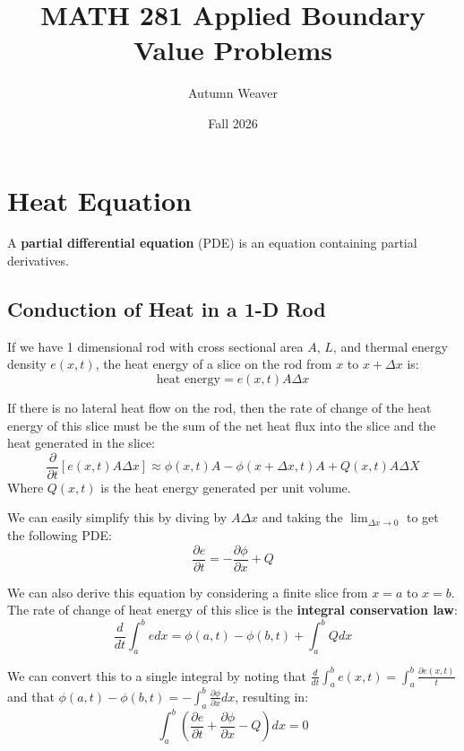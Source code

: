 \documentclass{article}
\title{\textbf{MATH 281 Applied Boundary Value Problems}}
\author{Autumn Weaver}
\date{Fall 2026}
\begin{document}
\maketitle

\tableofcontents{\textbf{}}

\pagebreak

\pagestyle{fancy}
\fancyhead{}
\fancyhead[L]{\thetitle}

\section{Heat Equation}
\begin{definition}
A \textbf{partial differential equation} (PDE) is an equation 
containing partial derivatives. 
\end{definition}

\subsection{Conduction of Heat in a 1-D Rod}

If we have 1 dimensional rod with cross sectional area \(A\), \(L\), and thermal energy density \(e(x,t)\), the heat energy of a slice on the rod 
from \(x\) to \(x+\Delta x\) is:
\[
    \text{heat energy}=e(x,t)A\Delta x
\]  

If there is no lateral heat flow on the rod, then the rate of change of the heat energy of 
this slice must be the sum of the net heat flux into the slice and the heat generated in the slice:
\[
    \frac{\partial }{\partial t}[e(x,t)A\Delta x]\approx \phi(x, t)A-\phi(x+\Delta x, t)A+Q(x, t)A\Delta X
\]
Where \(Q(x, t)\) is the heat energy generated per unit volume.


We can easily simplify this by diving by \(A \Delta x\) and taking the \(\lim_{\Delta x \rightarrow 0}\)  to get the following PDE:
\[
    \frac{\partial e}{\partial t}=-\frac{\partial \phi}{\partial x}+Q
\]

We can also derive this equation by considering a finite slice from \(x=a\) to \(x=b\). The rate of change of heat energy of this slice is the \textbf{integral conservation law}: 
\[
    \frac{d}{dt}\int_a^b e dx=\phi(a,t)-\phi (b,t)+\int_a^b Q dx
\]

We can convert this to a single integral by noting that \(\frac{d}{dt}\int_a^b e(x, t)=\int_a^b\frac{\partial e(x, t)}{t}\) and that 
\(\phi(a, t)-\phi(b, t)=-\int_a^b \frac{\partial \phi}{\partial x}dx\), resulting in: 
\[
    \int_a^b (\frac{\partial e}{\partial t}+\frac{\partial \phi}{\partial x}-Q)dx=0
\]
\end{document}
